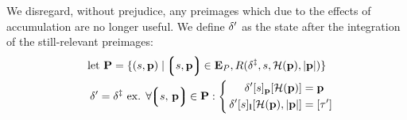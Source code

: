 We disregard, without prejudice, any preimages which due to the effects of accumulation are no longer useful. We define $\delta'$ as the state after the integration of the still-relevant preimages:
\begin{align}
  \using \mathbf{P} = \{
    (s, \mathbf{p})
    \mid
      \tup{s, \mathbf{p}} \in \xtpreimages, R(\accountspostxfer, s, \mathcal{H}(\mathbf{p}), |\mathbf{p}|)
    \}\\
  \accountspostpreimage = \accountspostxfer \text{ ex. } \forall \tup{s\ts\mathbf{p}} \in \mathbf{P} : \left\{\,\begin{aligned}
      \quad\accountspostpreimage[s]_\mathbf{p}[\mathcal{H}(\mathbf{p})] &= \mathbf{p} \\
      \accountspostpreimage[s]_\mathbf{l}[\mathcal{H}(\mathbf{p}), |\mathbf{p}|] &= [\tau']
    \end{aligned}\right.\!\!\!\!
\end{align}
